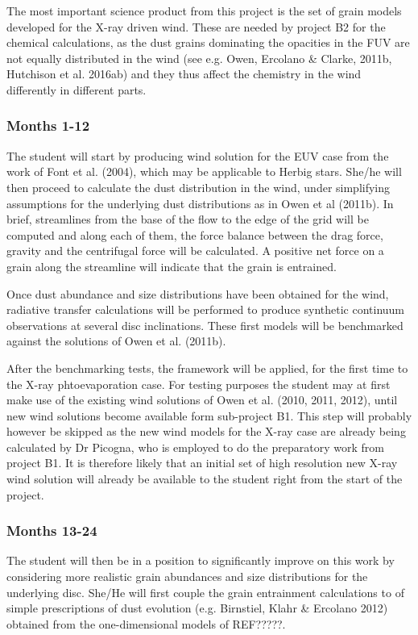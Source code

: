 \documentclass[10pt,fleqn,twoside]{article}
\begin{document}
The most important science product from this project is the set of
grain models developed for the  X-ray driven wind. These are needed by
project B2 for the chemical calculations, as the dust
grains dominating the opacities in the FUV are not equally distributed
in the wind (see e.g. Owen, Ercolano \& Clarke, 2011b, Hutchison et
al. 2016ab) and they thus affect the chemistry in the wind
differently in different parts. 

\subsubsection{Months 1-12}
The student will start by producing wind solution for the EUV case
from the work of Font et al. (2004), which may be applicable to Herbig
stars. She/he will then proceed to calculate the dust distribution in
the wind, under simplifying assumptions for the underlying dust
distributions as in Owen et al (2011b). In brief, streamlines from the
base of the flow to the edge of the grid will be computed and along
each of them, the force balance between the drag force, gravity and
the centrifugal force will be calculated. A positive net force on a
grain along the streamline will indicate that the grain is
entrained. 

Once dust abundance and size distributions have been obtained for the
wind, radiative transfer calculations will be performed to produce
synthetic continuum observations at several disc inclinations. 
These first models will be benchmarked against the solutions
of Owen et al. (2011b).

After the benchmarking tests, the framework will be applied, for the
first time to the X-ray phtoevaporation case. For testing purposes the student may at first make use of the
existing wind solutions of Owen et al. (2010, 2011, 2012), until new
wind solutions become available form sub-project B1. This step will
probably however be skipped as the new wind models for the X-ray case
are already being calculated by Dr Picogna, who is employed to do the
preparatory work from project B1. It is therefore likely that an
initial set of high resolution new X-ray wind solution will already be
available to the student right from the start of the project.
 

\subsubsection{Months 13-24}
The student will then be in a position to
significantly improve on this work by considering more realistic grain
abundances and size distributions for the underlying disc. She/He will
first couple the grain entrainment calculations to of simple
prescriptions of dust evolution (e.g.  Birnstiel,
Klahr \& Ercolano 2012) obtained from the one-dimensional models of
REF?????. 
\end{document}
